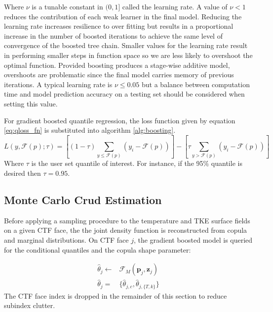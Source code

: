 Where $\nu$ is a tunable constant in $(0, 1]$ called the learning rate.  A value of $\nu < 1$ reduces the contribution of each weak learner in the final model.  Reducing the learning rate increases resilience to over fitting but results in a proportional increase in the number of boosted iterations to achieve the same level of convergence of the boosted tree chain.  Smaller values for the learning rate result in performing smaller steps in function space so we are less likely to overshoot the optimal function. Provided boosting produces a stage-wise additive model, overshoots are problematic since the final model carries memory of previous iterations.  A typical learning rate is $\nu\leq 0.05$ but a balance between computation time and model prediction accuracy on a testing set should be considered when setting this value.

For gradient boosted quantile regression, the loss function given by equation \ref{eq:qloss_fn} is substituted into algorithm \ref{alg:boosting}.
\begin{equation}
L(y, \mathcal F(p);\tau) = \left[ (1-\tau) \sum_{y \leq \mathcal F(p)}( y_i - \mathcal F(p) ) \right] - \left[ \tau \sum_{y > \mathcal F(p)} (y_i - \mathcal F(p)) \right]
\end{equation}
Where $\tau$ is the user set quantile of interest. For instance, if the 95\% quantile is desired then $\tau=0.95$.



\subsection{Monte Carlo Crud Estimation}
\label{chap:mc_crud}

Before applying a sampling procedure to the temperature and TKE surface fields on a given CTF face, the the joint density function is reconstructed from copula and marginal distributions.   On CTF face $j$, the gradient boosted model is queried for the conditional quantiles and the copula shape parameter:

\begin{align}
\hat \theta_j \leftarrow  & {\mathcal F_M}(\mathbf p_j, \mathbf z_j) \nonumber \\
 \hat \theta_j =& \{\hat \theta_{j,c}, \hat \theta_{j,\{T,k\}} \}
\end{align}
The CTF face index is dropped in the remainder of this section to reduce subindex clutter.

